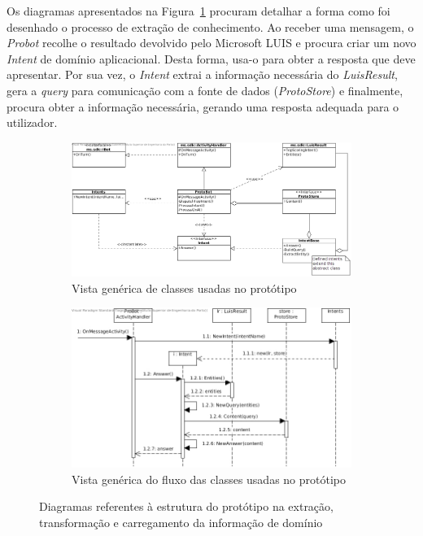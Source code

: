 Os diagramas apresentados na Figura~\ref{fig:prototype_classworkflow} procuram detalhar a forma como foi desenhado o processo de extração de conhecimento. Ao receber uma mensagem, o \textit{Probot} recolhe o resultado devolvido pelo Microsoft LUIS e procura criar um novo \textit{Intent} de domínio aplicacional. Desta forma, usa-o para obter a resposta que deve apresentar. Por sua vez, o \textit{Intent} extrai a informação necessária do \textit{LuisResult}, gera a \textit{query} para comunicação com a fonte de dados (\textit{ProtoStore}) e finalmente, procura obter a informação necessária, gerando uma resposta adequada para o utilizador.  
%
\begin{figure}
\centering
    \begin{subfigure}{\textwidth}
        \centering
        \includegraphics[width=.95\textwidth]{ch05/assets/prototype-classes.jpg}
        \caption{Vista genérica de classes usadas no protótipo}
     \end{subfigure}
     \bigbreak
     \bigbreak
     \begin{subfigure}{\textwidth}
         \centering
        \includegraphics[width=\textwidth]{ch05/assets/prototype-workflow.jpg}
        \caption{Vista genérica do fluxo das classes usadas no protótipo}
     \end{subfigure}
\caption{Diagramas referentes à estrutura do protótipo na extração, transformação e carregamento da informação de domínio}
\label{fig:prototype_classworkflow}
\end{figure}

